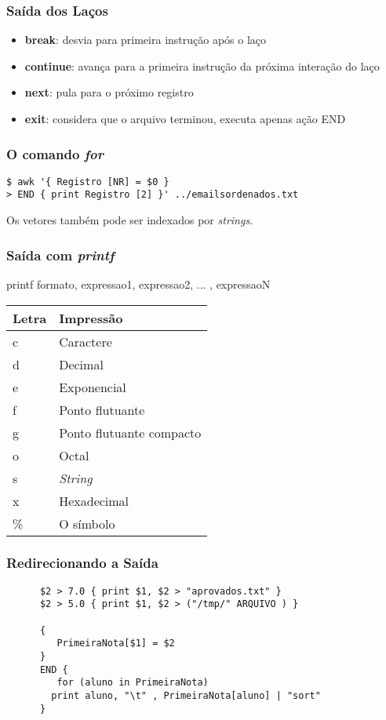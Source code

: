 \documentclass{beamer}
\begin{document}
   \begin{frame}
      \frametitle{Saída dos Laços}
      \begin{itemize}
         \item \textbf{break}: desvia para primeira instrução após o laço
	 \item \textbf{continue}: avança para a primeira instrução da próxima interação do laço
	 \item \textbf{next}: pula para o próximo registro
	 \item \textbf{exit}: considera que o arquivo terminou, executa apenas ação END
      \end{itemize}
   \end{frame}

   \begin{frame}[fragile]
      \frametitle{O comando \textit{for}}
      \begin{verbatim}
$ awk '{ Registro [NR] = $0 } 
> END { print Registro [2] }' ../emailsordenados.txt 
      \end{verbatim}
      Os vetores também pode ser indexados por \textit{strings}.\\
\end{frame}

   \begin{frame}
      \frametitle{Saída com \textit{printf}}
      printf formato, expressao1, expressao2, ... , expressaoN \\
      \begin{table}
         \begin{tabular}{l|l}
	 Letra & Impressão \\
	 \hline
         c & Caractere \\
         d & Decimal \\
         e & Exponencial \\
         f & Ponto flutuante \\
         g & Ponto flutuante compacto \\
         o & Octal \\
         s & \textit{String} \\
         x & Hexadecimal \\
         \% & O símbolo \\
         \end{tabular}
      \end{table}
   \end{frame}

   \begin{frame}[fragile]
      \frametitle{Redirecionando a Saída}
      \footnotesize
      \begin{verbatim}
      $2 > 7.0 { print $1, $2 > "aprovados.txt" }
      $2 > 5.0 { print $1, $2 > ("/tmp/" ARQUIVO ) }

      {
         PrimeiraNota[$1] = $2
      }
      END {
         for (aluno in PrimeiraNota) 
	    print aluno, "\t" , PrimeiraNota[aluno] | "sort" 
      }

      \end{verbatim}
\end{frame}
\end{document}
